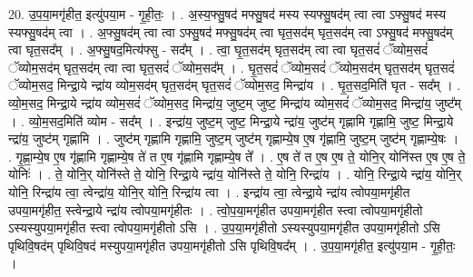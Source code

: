 \documentclass[17pt]{extarticle}
\begin{document}
20. उ॒प॒या॒मगृ॑हीत॒ इत्यु॑पया॒म - गृ॒ही॒तः॒ । . अ॒स्य॒फ्सु॒षद॑ मफ्सु॒षद॑ मस्य स्यफ्सु॒षद॑म् त्वा त्वा ऽफ्सु॒षद॑ मस्य स्यफ्सु॒षद॑म् त्वा । . अ॒फ्सु॒षद॑म् त्वा त्वा ऽफ्सु॒षद॑ मफ्सु॒षद॑म् त्वा घृत॒सद॑म् घृत॒सद॑म् त्वा ऽफ्सु॒षद॑ मफ्सु॒षद॑म् त्वा घृत॒सद᳚म् । . अ॒फ्सु॒षद॒मित्य॑फ्सु - सद᳚म् । . त्वा॒ घृ॒त॒सद॑म् घृत॒सद॑म् त्वा त्वा घृत॒सदं॑ ॅव्योम॒सदं॑ ॅव्योम॒सद॑म् घृत॒सद॑म् त्वा त्वा घृत॒सदं॑ ॅव्योम॒सद᳚म् । . घृ॒त॒सदं॑ ॅव्योम॒सदं॑ ॅव्योम॒सद॑म् घृत॒सद॑म् घृत॒सदं॑ ॅव्योम॒सद॒ मिन्द्रा॒ये न्द्रा॑य व्योम॒सद॑म् घृत॒सद॑म् घृत॒सदं॑ ॅव्योम॒सद॒ मिन्द्रा॑य । . घृ॒त॒सद॒मिति॑ घृत - सद᳚म् । . व्यो॒म॒सद॒ मिन्द्रा॒ये न्द्रा॑य व्योम॒सदं॑ ॅव्योम॒सद॒ मिन्द्रा॑य॒ जुष्ट॒म् जुष्ट॒ मिन्द्रा॑य व्योम॒सदं॑ ॅव्योम॒सद॒ मिन्द्रा॑य॒ जुष्ट᳚म् । . व्यो॒म॒सद॒मिति॑ व्योम - सद᳚म् । . इन्द्रा॑य॒ जुष्ट॒म् जुष्ट॒ मिन्द्रा॒ये न्द्रा॑य॒ जुष्ट॑म् गृह्णामि गृह्णामि॒ जुष्ट॒ मिन्द्रा॒ये न्द्रा॑य॒ जुष्ट॑म् गृह्णामि । . जुष्ट॑म् गृह्णामि गृह्णामि॒ जुष्ट॒म् जुष्ट॑म् गृह्णाम्ये॒ष ए॒ष गृ॑ह्णामि॒ जुष्ट॒म् जुष्ट॑म् गृह्णाम्ये॒षः । . गृ॒ह्णा॒म्ये॒ष ए॒ष गृ॑ह्णामि गृह्णाम्ये॒ष ते॑ त ए॒ष गृ॑ह्णामि गृह्णाम्ये॒ष ते᳚ । . ए॒ष ते॑ त ए॒ष ए॒ष ते॒ योनि॒र् योनि॑स्त ए॒ष ए॒ष ते॒ योनिः॑ । . ते॒ योनि॒र् योनि॑स्ते ते॒ योनि॒ रिन्द्रा॒ये न्द्रा॑य॒ योनि॑स्ते ते॒ योनि॒ रिन्द्रा॑य । . योनि॒ रिन्द्रा॒ये न्द्रा॑य॒ योनि॒र् योनि॒ रिन्द्रा॑य त्वा॒ त्वेन्द्रा॑य॒ योनि॒र् योनि॒ रिन्द्रा॑य त्वा । . इन्द्रा॑य त्वा॒ त्वेन्द्रा॒ये न्द्रा॑य त्वोपया॒मगृ॑हीत उपया॒मगृ॑हीत॒ स्त्वेन्द्रा॒ये न्द्रा॑य त्वोपया॒मगृ॑हीतः । . त्वो॒प॒या॒मगृ॑हीत उपया॒मगृ॑हीत स्त्वा त्वोपया॒मगृ॑हीतो ऽस्यस्युपया॒मगृ॑हीत स्त्वा त्वोपया॒मगृ॑हीतो ऽसि । . उ॒प॒या॒मगृ॑हीतो ऽस्यस्युपया॒मगृ॑हीत उपया॒मगृ॑हीतो ऽसि पृथिवि॒षद॑म् पृथिवि॒षद॑ मस्युपया॒मगृ॑हीत उपया॒मगृ॑हीतो ऽसि पृथिवि॒षद᳚म् । . उ॒प॒या॒मगृ॑हीत॒ इत्यु॑पया॒म - गृ॒ही॒तः॒ । \newline
\end{document}
